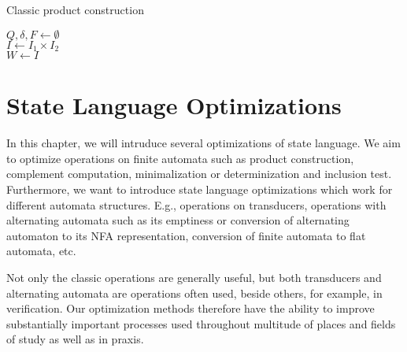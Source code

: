 \begin{algorithm}
\caption{Classic product construction}\label{productConstructionAlg}
\DontPrintSemicolon
{}
\BlankLine
$Q, \delta, F \gets \emptyset$ \\
$I \gets I_1 \times I_2$ \\
$W \gets  I$

\end{algorithm}\DecMargin{1em}


\chapter{State Language Optimizations}

In this chapter, we will intruduce several optimizations of state language. We aim to optimize operations on finite automata such as product construction, complement computation, minimalization or determinization and inclusion test. Furthermore, we want to introduce state language optimizations which work for different automata structures. E.g., operations on transducers, operations with alternating automata such as its emptiness or conversion of alternating automaton to its NFA representation, conversion of finite automata to flat automata, etc.

Not only the classic operations are generally useful, but both transducers and alternating automata are operations often used, beside others, for example, in verification. Our optimization methods therefore have the ability to improve substantially important processes used throughout multitude of places and fields of study as well as in praxis.

